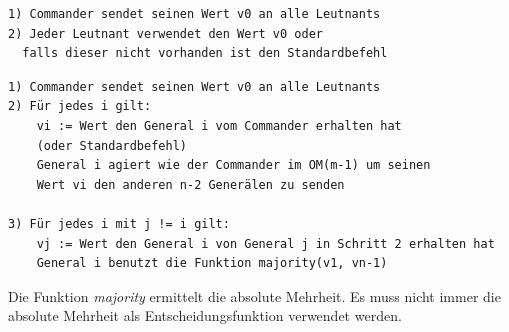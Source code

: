 \documentclass{article}
\begin{document}
\begin{lstlisting}[caption=Algorithmus OM(0)]
1) Commander sendet seinen Wert v0 an alle Leutnants
2) Jeder Leutnant verwendet den Wert v0 oder 
  falls dieser nicht vorhanden ist den Standardbefehl
\end{lstlisting}

\medskip

\begin{lstlisting}[caption=Algorithmus OM(m) m > 0]
1) Commander sendet seinen Wert v0 an alle Leutnants
2) Für jedes i gilt:
    vi := Wert den General i vom Commander erhalten hat 
    (oder Standardbefehl)
    General i agiert wie der Commander im OM(m-1) um seinen 
    Wert vi den anderen n-2 Generälen zu senden

3) Für jedes i mit j != i gilt:
    vj := Wert den General i von General j in Schritt 2 erhalten hat
    General i benutzt die Funktion majority(v1, vn-1)
\end{lstlisting}

Die Funktion \textit{majority} ermittelt die absolute Mehrheit. 
Es muss nicht immer die absolute Mehrheit als Entscheidungsfunktion verwendet werden.

\end{document}
